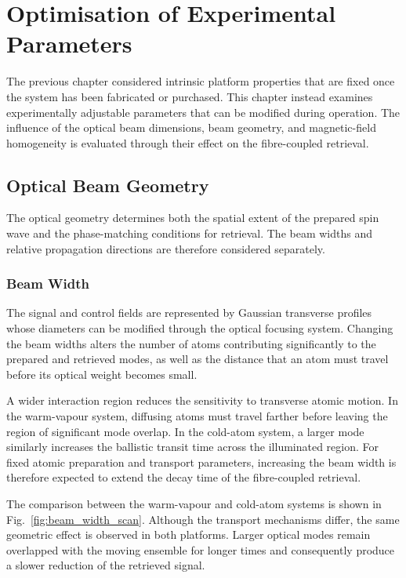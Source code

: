 \chapter{Optimisation of Experimental Parameters}
\label{chap:experimental_optimisation}

The previous chapter considered intrinsic platform properties that are fixed once the system has been fabricated or purchased. This chapter instead examines experimentally adjustable parameters that can be modified during operation. The influence of the optical beam dimensions, beam geometry, and magnetic-field homogeneity is evaluated through their effect on the fibre-coupled retrieval.

\section{Optical Beam Geometry}
\label{sec:results_optical_beam_geometry}

The optical geometry determines both the spatial extent of the prepared spin wave and the phase-matching conditions for retrieval. The beam widths and relative propagation directions are therefore considered separately.

\subsection{Beam Width}
\label{sec:results_beam_width}

The signal and control fields are represented by Gaussian transverse profiles whose diameters can be modified through the optical focusing system. Changing the beam widths alters the number of atoms contributing significantly to the prepared and retrieved modes, as well as the distance that an atom must travel before its optical weight becomes small.

A wider interaction region reduces the sensitivity to transverse atomic motion. In the warm-vapour system, diffusing atoms must travel farther before leaving the region of significant mode overlap. In the cold-atom system, a larger mode similarly increases the ballistic transit time across the illuminated region. For fixed atomic preparation and transport parameters, increasing the beam width is therefore expected to extend the decay time of the fibre-coupled retrieval.

The comparison between the warm-vapour and cold-atom systems is shown in Fig.~\ref{fig:beam_width_scan}. Although the transport mechanisms differ, the same geometric effect is observed in both platforms. Larger optical modes remain overlapped with the moving ensemble for longer times and consequently produce a slower reduction of the retrieved signal.

